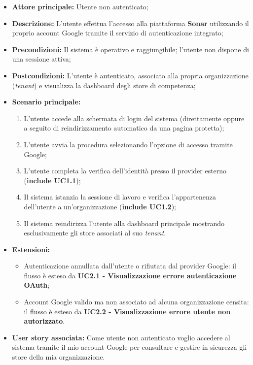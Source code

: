 \begin{itemize}
    \item \textbf{Attore principale:} Utente non autenticato;
    \item \textbf{Descrizione:} L'utente effettua l'accesso alla piattaforma \textbf{Sonar} utilizzando il proprio account Google tramite il servizio di autenticazione integrato;
    \item \textbf{Precondizioni:} Il sistema è operativo e raggiungibile; l'utente non dispone di una sessione attiva;
    \item \textbf{Postcondizioni:} L'utente è autenticato, associato alla propria organizzazione (\textit{tenant}) e visualizza la dashboard degli store di competenza;
    \item \textbf{Scenario principale:}
    \begin{enumerate}
        \item L'utente accede alla schermata di login del sistema (direttamente oppure a seguito di reindirizzamento automatico da una pagina protetta);
        \item L'utente avvia la procedura selezionando l'opzione di accesso tramite Google;
        \item L'utente completa la verifica dell'identità presso il provider esterno (\textbf{include UC1.1});
        \item Il sistema istanzia la sessione di lavoro e verifica l'appartenenza dell'utente a un'organizzazione (\textbf{include UC1.2});
        \item Il sistema reindirizza l'utente alla dashboard principale mostrando esclusivamente gli store associati al suo \textit{tenant}.
    \end{enumerate}
    \item \textbf{Estensioni:}
    \begin{itemize}
        \item Autenticazione annullata dall'utente o rifiutata dal provider Google: il flusso è esteso da \textbf{UC2.1 - Visualizzazione errore autenticazione OAuth};
        \item Account Google valido ma non associato ad alcuna organizzazione censita: il flusso è esteso da \textbf{UC2.2 - Visualizzazione errore utente non autorizzato}.
    \end{itemize}
    \item \textbf{User story associata:} Come utente non autenticato voglio accedere al sistema tramite il mio account Google per consultare e gestire in sicurezza gli store della mia organizzazione.
\end{itemize}

